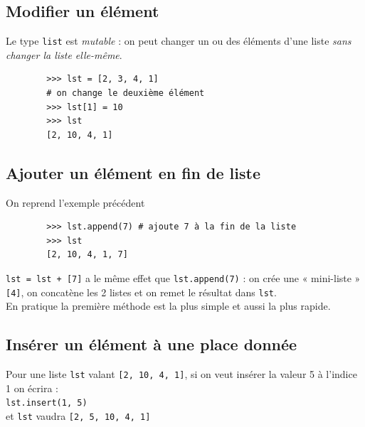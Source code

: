 \subsection{Modifier un élément}
Le type \texttt{list} est \textit{mutable} : on peut changer un ou des éléments d'une liste \textit{sans changer la liste elle-même}.

\begin{pyc}
	\begin{verbatim}
		>>> lst = [2, 3, 4, 1]
		# on change le deuxième élément
		>>> lst[1] = 10
		>>> lst
		[2, 10, 4, 1]
	\end{verbatim}
\end{pyc}
\subsection{Ajouter un élément en fin de liste}

On reprend l'exemple précédent

\begin{pyc}
	\begin{verbatim}
		>>> lst.append(7) # ajoute 7 à la fin de la liste
		>>> lst
		[2, 10, 4, 1, 7]
	\end{verbatim}
\end{pyc}

\begin{remarque}
	\texttt{lst = lst + [7]} a le même effet  que \texttt{lst.append(7)} : on crée une « mini-liste » \texttt{[4]}, on concatène les 2 listes et on remet le résultat dans \texttt{lst}.\\
	En pratique la première méthode est la plus simple et aussi la plus rapide.
\end{remarque}

\subsection{Insérer un élément à une place donnée}

Pour une liste \texttt{lst} valant \texttt{[2, 10, 4, 1]}, si on veut insérer la valeur 5 à l'indice 1 on écrira :\\

\texttt{lst.insert(1, 5)} \\

et \texttt{lst} vaudra \texttt{[2, 5, 10, 4, 1]}\\

